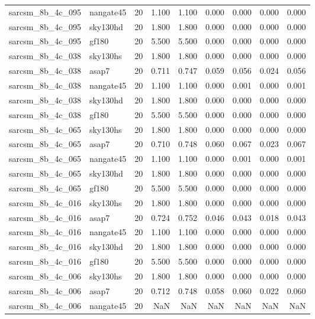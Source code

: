 \begin{tabular}{llrrrrrrr}
sarcsm\_8b\_4c\_095 & nangate45 & 20 & 1.100 & 1.100 & 0.000 & 0.000 & 0.000 & 0.000 \\
sarcsm\_8b\_4c\_095 & sky130hd & 20 & 1.800 & 1.800 & 0.000 & 0.000 & 0.000 & 0.000 \\
sarcsm\_8b\_4c\_095 & gf180 & 20 & 5.500 & 5.500 & 0.000 & 0.000 & 0.000 & 0.000 \\
sarcsm\_8b\_4c\_038 & sky130hs & 20 & 1.800 & 1.800 & 0.000 & 0.000 & 0.000 & 0.000 \\
sarcsm\_8b\_4c\_038 & asap7 & 20 & 0.711 & 0.747 & 0.059 & 0.056 & 0.024 & 0.056 \\
sarcsm\_8b\_4c\_038 & nangate45 & 20 & 1.100 & 1.100 & 0.000 & 0.001 & 0.000 & 0.001 \\
sarcsm\_8b\_4c\_038 & sky130hd & 20 & 1.800 & 1.800 & 0.000 & 0.000 & 0.000 & 0.000 \\
sarcsm\_8b\_4c\_038 & gf180 & 20 & 5.500 & 5.500 & 0.000 & 0.000 & 0.000 & 0.000 \\
sarcsm\_8b\_4c\_065 & sky130hs & 20 & 1.800 & 1.800 & 0.000 & 0.000 & 0.000 & 0.000 \\
sarcsm\_8b\_4c\_065 & asap7 & 20 & 0.710 & 0.748 & 0.060 & 0.067 & 0.023 & 0.067 \\
sarcsm\_8b\_4c\_065 & nangate45 & 20 & 1.100 & 1.100 & 0.000 & 0.001 & 0.000 & 0.001 \\
sarcsm\_8b\_4c\_065 & sky130hd & 20 & 1.800 & 1.800 & 0.000 & 0.000 & 0.000 & 0.000 \\
sarcsm\_8b\_4c\_065 & gf180 & 20 & 5.500 & 5.500 & 0.000 & 0.000 & 0.000 & 0.000 \\
sarcsm\_8b\_4c\_016 & sky130hs & 20 & 1.800 & 1.800 & 0.000 & 0.000 & 0.000 & 0.000 \\
sarcsm\_8b\_4c\_016 & asap7 & 20 & 0.724 & 0.752 & 0.046 & 0.043 & 0.018 & 0.043 \\
sarcsm\_8b\_4c\_016 & nangate45 & 20 & 1.100 & 1.100 & 0.000 & 0.000 & 0.000 & 0.000 \\
sarcsm\_8b\_4c\_016 & sky130hd & 20 & 1.800 & 1.800 & 0.000 & 0.000 & 0.000 & 0.000 \\
sarcsm\_8b\_4c\_016 & gf180 & 20 & 5.500 & 5.500 & 0.000 & 0.000 & 0.000 & 0.000 \\
sarcsm\_8b\_4c\_006 & sky130hs & 20 & 1.800 & 1.800 & 0.000 & 0.000 & 0.000 & 0.000 \\
sarcsm\_8b\_4c\_006 & asap7 & 20 & 0.712 & 0.748 & 0.058 & 0.060 & 0.022 & 0.060 \\
sarcsm\_8b\_4c\_006 & nangate45 & 20 & NaN & NaN & NaN & NaN & NaN & NaN \\

\end{tabular}
